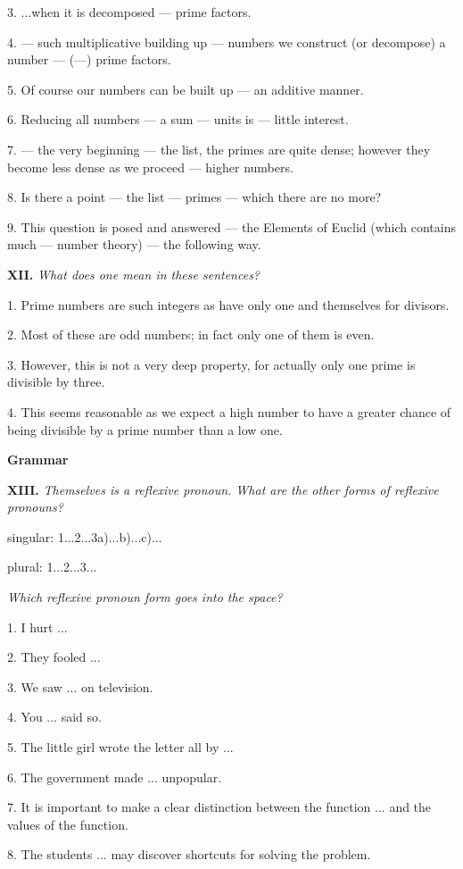 \documentclass[a4paper]{article}
\newcommand{\ESect}[1]{\medskip\par{\large \textbf{#1}}\par}
\newcommand{\ETask}[2]{\medskip\par\textbf{#1.} \textit{#2}\par}
\begin{document}
3. ...when it is decomposed --- prime factors.

4. --- such multiplicative building up --- numbers we construct (or decompose) a number --- (---) prime factors.

5. Of course our numbers can be built up --- an additive manner.

6. Reducing all numbers --- a sum --- units is --- little interest.

7. --- the very beginning --- the list, the primes are quite dense; however they become less dense as we proceed --- higher numbers.

8. Is there a point --- the list --- primes --- which there are no more?

9. This question is posed and answered --- the Elements of Euclid (which contains much --- number theory) --- the following way.

\ETask{XII}{What does one mean in these sentences?}

1. Prime numbers are such integers as have only one and themselves for divisors.

2. Most of these are odd numbers; in fact only one of them is even.

3. However, this is not a very deep property, for actually only one prime is divisible by three.

4. This seems reasonable as we expect a high number to have a greater chance of being divisible by a prime number than a low one.

\ESect{Grammar}

\ETask{XIII}{Themselves is a reflexive pronoun. What are the other forms of reflexive pronouns?}

singular: 1...2...3a)...b)...c)...

plural: 1...2...3...

\textit{Which reflexive pronoun form goes into the space?}

1. I hurt ...

2. They fooled ...

3. We saw ... on television.

4. You ... said so.

5. The little girl wrote the letter all by ...

6. The government made ... unpopular.

7. It is important to make a clear distinction between the function ... and the values of the function.

8. The students ... may discover shortcuts for solving the problem.
\end{document}
